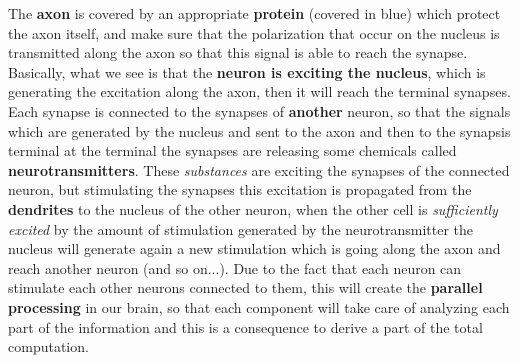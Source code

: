 \documentclass{article}
\begin{document}
\noindent The \textbf{axon} is covered by an appropriate \textbf{protein} (covered in blue) which protect the axon itself,
and make sure that the polarization that occur on the nucleus is transmitted along the axon so that this signal is able
to reach the synapse.
\newline\newline
Basically, what we see is that the \textbf{neuron is exciting the nucleus}, which is generating the excitation along the axon,
then it will reach the terminal synapses.
\newline\newline
Each synapse is connected to the synapses of \textbf{another} neuron, so that the signals which are generated by
the nucleus and sent to the axon and then to the synapsis terminal at the terminal the synapses
are releasing some chemicals called \textbf{neurotransmitters}.
\newline\newline
These \textit{substances} are exciting the synapses of the connected neuron, but stimulating the synapses this excitation is
propagated from the \textbf{dendrites} to the nucleus of the other neuron, when the other cell is \textit{sufficiently excited} by
the amount of stimulation generated by the neurotransmitter the nucleus will generate again a new stimulation
which is going along the axon and reach another neuron (and so on...).
\newline\newline
Due to the fact that each neuron can stimulate each other neurons connected to them,
this will create the \textbf{parallel processing} in our brain, so that each component will take care
of analyzing each part of the information and this is a consequence to derive a part of the total computation.
\end{document}
